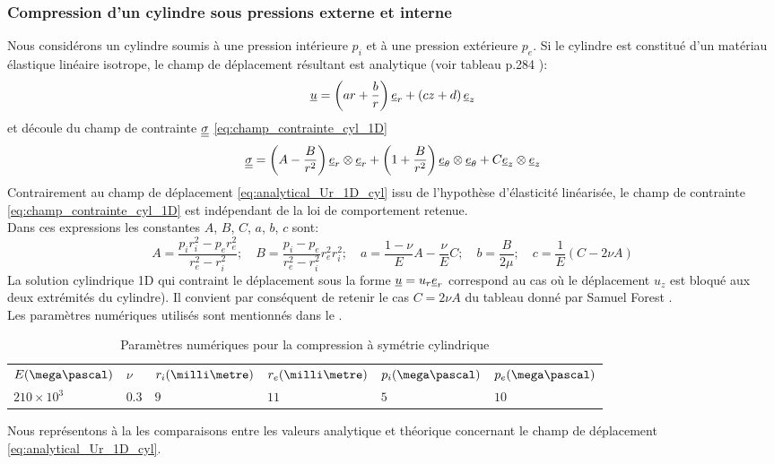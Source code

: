 \documentclass[10pt]{book}
\begin{document}
\subsubsection{Compression d'un cylindre sous pressions externe et interne}\label{Subsection:Compression d'un cylindre sous pressions externe et interne}
Nous considérons un cylindre soumis à une pression intérieure $p_{i}$ et à une pression extérieure $p_{e}$. Si le cylindre est constitué d'un matériau élastique linéaire isotrope, le champ de déplacement résultant est analytique (voir tableau p.284 \cite{forest2015mecanique}):
\begin{equation}
\underline{u} = \left(ar+\dfrac{b}{r}\right)\underline{e}_{r}+\left(cz+d\right)\underline{e}_{z}
\label{eq:analytical_Ur_1D_cyl}
\end{equation}
et découle du champ de contrainte $\underline{\underline{\sigma}}$ \eqref{eq:champ_contrainte_cyl_1D}
\begin{equation}
\underline{\underline{\sigma}} = \left(A-\dfrac{B}{r^{2}}\right)\underline{e}_{r}\otimes\underline{e}_{r}+\left(1+\dfrac{B}{r^{2}}\right)\underline{e}_{\theta}\otimes\underline{e}_{\theta}+C\underline{e}_{z}\otimes\underline{e}_{z}
\label{eq:champ_contrainte_cyl_1D}
\end{equation}
Contrairement au champ de déplacement \eqref{eq:analytical_Ur_1D_cyl} issu de l'hypothèse d'élasticité linéarisée, le champ de contrainte \eqref{eq:champ_contrainte_cyl_1D} est indépendant de la loi de comportement retenue.\\

Dans ces expressions les constantes $A$, $B$, $C$, $a$, $b$, $c$ sont:
\begin{equation}
A=\dfrac{p_{i}r_{i}^{2}-p_{e}r_{e}^{2}}{r_{e}^{2}-r_{i}^{2}}; \quad B=\dfrac{p_{i}-p_{e}}{r_{e}^{2}-r_{i}^{2}}r_{e}^{2}r_{i}^{2}; \quad a=\dfrac{1-\nu}{E}A-\dfrac{\nu}{E}C; \quad b=\dfrac{B}{2\mu}; \quad c=\dfrac{1}{E}\left(C-2\nu A\right)
\label{eq:A_B_C_compression_cylindrique}
\end{equation}
La solution cylindrique 1D qui contraint le déplacement sous la forme $\underline{u} = u_{r}\underline{e}_{r}$ correspond au cas où le déplacement $u_{z}$ est bloqué aux deux extrémités du cylindre). Il convient par conséquent de retenir le cas \og $C=2\nu A$ \fg{} du tableau donné par Samuel Forest \cite{forest2015mecanique}.\\

Les paramètres numériques utilisés sont mentionnés dans le .
\begin{table}
\centering \begin{tabular}{llllll}\hline
$E(\mega\pascal)$  & $\nu$ & $r_{i}(\milli\metre)$ & $r_{e}(\milli\metre)$ & $p_{i}(\mega\pascal)$ & $p_{e}(\mega\pascal)$\\
$210\times10^{3}$ & 0.3 & $9$ & $11$ & $5$ & $10$\\\hline
\end{tabular}
\caption{Paramètres numériques pour la compression à symétrie cylindrique}
\label{fig:compa_analytique_num_compr_cyl_1D}
\end{table}
Nous représentons à la  les comparaisons entre les valeurs analytique et théorique concernant le champ de déplacement \eqref{eq:analytical_Ur_1D_cyl}.
\end{document}

